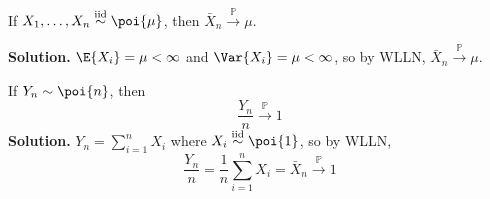 \begin{Example}{}{}
    If $ X_1,\ldots,X_n\stackrel{\text{iid}}{\sim}\poi{\mu} $, then
    $ \bar{X}_n\stackrel{\mathbb{P}}{\to}\mu $.

    \textbf{Solution.} $ \E{X_i}=\mu<\infty $ and $ \Var{X_i}=\mu<\infty $,
    so by WLLN, $ \bar{X}_n\stackrel{\mathbb{P}}{\to}\mu  $.
\end{Example}
\begin{Exercise}{}{}
    If $ Y_n \sim \poi{n} $, then
    \[ \frac{Y_n}{n} \stackrel{\mathbb{P}}{\to}1 \]
    \textbf{Solution.} $ Y_n=\sum_{i=1}^{n} X_i $
    where $ X_i\stackrel{\text{iid}}{\sim}\poi{1} $,
    so by WLLN,
    \[ \frac{Y_n}{n} =\frac{1}{n}\sum_{i=1}^{n} X_i=
        \bar{X}_n \stackrel{\mathbb{P}}{\to}1 \]
\end{Exercise}
